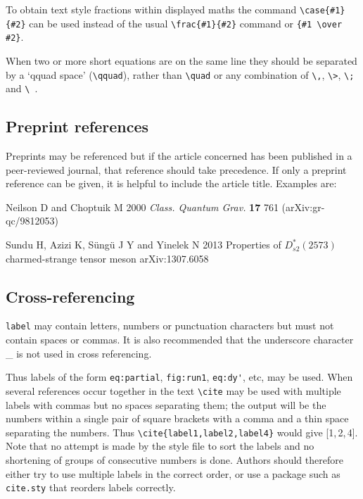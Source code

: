 To obtain text style fractions within displayed maths the command
\verb"\case{#1}{#2}" can be used instead
of the usual \verb"\frac{#1}{#2}" command or \verb"{#1 \over #2}".

When two or more short equations are on the same line they should be
separated by a `qquad space' (\verb"\qquad"), rather than
\verb"\quad" or any combination of \verb"\,", \verb"\>", \verb"\;"
and \verb"\ ".

\subsection{Preprint references}
Preprints may be referenced but if the article concerned has been
published in a peer-reviewed journal, that reference should take
precedence. If only a preprint reference can be given, it is helpful to
include the article title. Examples are:
\vskip6pt
\item Neilson D and Choptuik M 2000 {\it Class. Quantum Grav.} {\bf 17}
        761 (arXiv:gr-qc/9812053)
\item Sundu H, Azizi K, S\"ung\"u J Y and Yinelek N 2013
        Properties of $D_{s2}^*(2573)$ charmed-strange tensor meson
        arXiv:1307.6058
\endnumrefs


\subsection{Cross-referencing\label{xrefs}}

\verb"label" may contain letters, numbers
or punctuation characters but must not contain spaces or commas. It is also
recommended that the underscore character \_{} is not used in cross
referencing.

Thus labels of the form \verb"eq:partial", \verb"fig:run1",
\verb"eq:dy'", etc, may be used. When several references occur together
in the text \verb"\cite" may be used with multiple labels with commas but
no spaces separating them; the output will be the numbers within a single
pair of square brackets with a comma and a thin space separating the
numbers. Thus \verb"\cite{label1,label2,label4}" would give [1,\,2,\,4].
Note that no attempt is made by the style file to sort the labels and no
shortening of groups of consecutive numbers is done. Authors should
therefore either try to use multiple labels in the correct order, or use
a package such as \verb"cite.sty" that reorders labels correctly.


